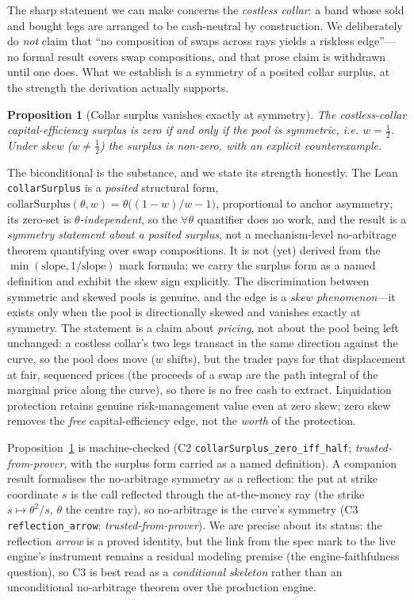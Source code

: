 \documentclass[11pt]{article}
\newtheorem{proposition}{Proposition}
\newcommand{\tfp}{\emph{trusted-from-prover}}
\begin{document}
The sharp statement we can make concerns the \emph{costless collar}: a band whose
sold and bought legs are arranged to be cash-neutral by construction. We
deliberately do \emph{not} claim that ``no composition of swaps across rays
yields a riskless edge''---no formal result covers swap compositions, and that
prose claim is withdrawn until one does. What we establish is a symmetry of a
posited collar surplus, at the strength the derivation actually supports.

\begin{proposition}[Collar surplus vanishes exactly at symmetry]\label{prop:collar}
The costless-collar capital-efficiency surplus is zero \emph{if and only if} the
pool is symmetric, i.e. $w=\tfrac12$. Under skew ($w\ne\tfrac12$) the surplus is
non-zero, with an explicit counterexample.
\end{proposition}

The biconditional is the substance, and we state its strength honestly. The Lean
\texttt{collarSurplus} is a \emph{posited} structural form,
$\mathrm{collarSurplus}(\theta,w)=\theta\bigl((1-w)/w-1\bigr)$, proportional to
anchor asymmetry; its zero-set is \emph{$\theta$-independent}, so the $\forall\theta$
quantifier does no work, and the result is a \emph{symmetry statement about a
posited surplus}, not a mechanism-level no-arbitrage theorem quantifying over swap
compositions. It is not (yet) derived from the $\min(\mathrm{slope},
1/\mathrm{slope})$ mark formula; we carry the surplus form as a named definition
and exhibit the skew sign explicitly. The discrimination between symmetric and
skewed pools is genuine, and the edge is a \emph{skew phenomenon}---it exists only
when the pool is directionally skewed and vanishes exactly at symmetry. The statement is a
claim about \emph{pricing}, not about the pool being left unchanged: a costless
collar's two legs transact in the same direction against the curve, so the pool
does move ($w$ shifts), but the trader pays for that displacement at fair,
sequenced prices (the proceeds of a swap are the path integral of the marginal
price along the curve), so there is no free cash to extract. Liquidation
protection retains genuine risk-management value even at zero skew; zero skew
removes the \emph{free} capital-efficiency edge, not the \emph{worth} of the
protection.

Proposition~\ref{prop:collar} is machine-checked (C2
\texttt{collarSurplus\_zero\_iff\_half}; \tfp{}, with the surplus form carried as
a named definition). A companion result formalises the no-arbitrage symmetry as a
reflection: the put at strike coordinate $s$ is the call reflected through the
at-the-money ray (the strike $s\mapsto\theta^{2}/s$, $\theta$ the centre ray), so
no-arbitrage is the curve's symmetry (C3 \texttt{reflection\_arrow}; \tfp{}). We are precise about its
status: the reflection \emph{arrow} is a proved identity, but the link from the
spec mark to the live engine's instrument remains a residual modeling premise (the
engine-faithfulness question), so C3 is best read as a \emph{conditional skeleton}
rather than an unconditional no-arbitrage theorem over the production engine.
\end{document}
